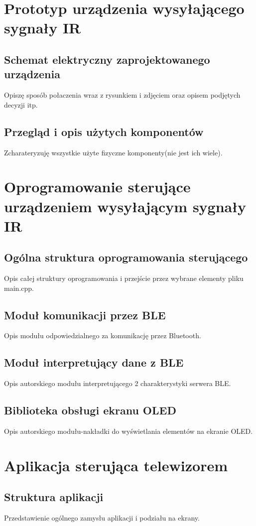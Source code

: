 \documentclass[12pt,twoside]{article}
\begin{document}
\clearpage	

\section{Prototyp urządzenia wysyłającego sygnały IR}
\subsection{Schemat elektryczny zaprojektowanego urządzenia}
Opiszę sposób połaczenia wraz z rysunkiem i zdjęciem oraz opisem podjętych decyzji itp.
\subsection{Przegląd i opis użytych komponentów}
Zcharateryzuję wszystkie użyte fizyczne komponenty(nie jest ich wiele).
\clearpage

\section{Oprogramowanie sterujące urządzeniem wysyłającym sygnały IR}
\subsection{Ogólna struktura oprogramowania sterującego}
Opis całej struktury oprogramowania i przejście przez wybrane elementy pliku main.cpp.
\subsection{Moduł komunikacji przez BLE}
Opis modułu odpowiedzialnego za komunikację przez Bluetooth.
\subsection{Moduł interpretujący dane z BLE}
Opis autorskiego modułu interpretującego 2 charakterystyki serwera BLE.

\subsection{Biblioteka obsługi ekranu OLED}
Opis autorskiego modułu-nakładki do wyświetlania elementów na ekranie OLED.
\clearpage

\section{Aplikacja sterująca telewizorem}
\subsection{Struktura aplikacji}
Przedstawienie ogólnego zamysłu aplikacji i podziału na ekrany.
\end{document}

